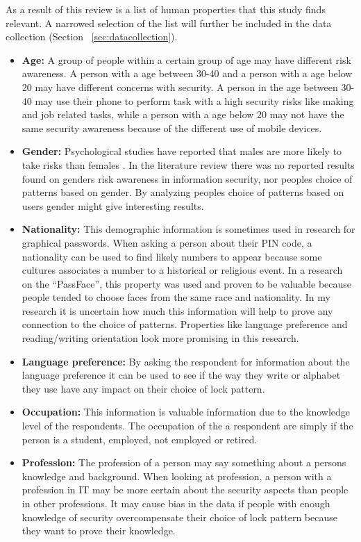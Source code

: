   As a result of this review is a list of human properties that this study finds relevant. A narrowed selection of the list will further be included in the data collection (Section ~\ref{sec:datacollection}).  

  \begin{itemize}
    \item {\bf Age:} A group of people within a certain group of age may have different risk awareness. A person with a age between 30-40 and a person with a age below 20 may have different concerns with security. A person in the age between 30-40 may use their phone to perform task with a high security risks like making and job related tasks, while a person with a age below 20 may not have the same security awareness because of the different use of mobile devices.
    \item {\bf Gender:} Psychological studies have reported that males are more likely to take risks than females \cite{Byrnes}. In the literature review there was no reported results found on genders risk awareness in information security, nor peoples choice of patterns based on gender. By analyzing peoples choice of patterns based on users gender might give interesting results. 
    \item {\bf Nationality:} This demographic information is sometimes used in research for graphical passwords. When asking a person about their PIN code, a nationality can be used to find likely numbers to appear because some cultures associates a number to a historical or religious event. In a research on the ``PassFace'', this property was used and proven to be valuable because people tended to choose faces from the same race and nationality. In my research it is uncertain how much this information will help to prove any connection to the choice of patterns. Properties like language preference and reading/writing orientation look more promising in this research.
    \item {\bf Language preference:} By asking the respondent for information about the language preference it can be used to see if the way they write or alphabet they use have any impact on their choice of lock pattern.
    \item{\bf Occupation:} This information is valuable information due to the knowledge level of the respondents. The occupation of the a respondent are simply if the person is a student, employed, not employed or retired.
    \item {\bf Profession:} The profession of a person may say something about a persons knowledge and background. When looking at profession, a person with a profession in IT may be more certain about the security aspects than people in other professions. It may cause bias in the data if people with enough knowledge of security overcompensate their choice of lock pattern because they want to prove their knowledge.  

\end{itemize}
